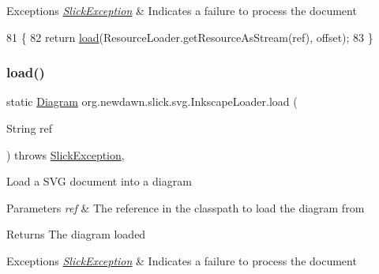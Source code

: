 \begin{DoxyExceptions}{Exceptions}
{\em \mbox{\hyperlink{classorg_1_1newdawn_1_1slick_1_1_slick_exception}{Slick\+Exception}}} & Indicates a failure to process the document \\
\hline
\end{DoxyExceptions}

\begin{DoxyCode}
81                                   \{
82         \textcolor{keywordflow}{return} \mbox{\hyperlink{classorg_1_1newdawn_1_1slick_1_1svg_1_1_inkscape_loader_a740ecc54efa6c6f4794f966ee42585cf}{load}}(ResourceLoader.getResourceAsStream(ref), offset);
83     \}
\end{DoxyCode}
\mbox{\label{classorg_1_1newdawn_1_1slick_1_1svg_1_1_inkscape_loader_a6033a0097a34ad7c33fe245416606b81}} 
\subsubsection{\texorpdfstring{load()}{load()}\hspace{0.1cm}{\footnotesize\ttfamily [2/3]}}
{\footnotesize\ttfamily static \mbox{\hyperlink{classorg_1_1newdawn_1_1slick_1_1svg_1_1_diagram}{Diagram}} org.\+newdawn.\+slick.\+svg.\+Inkscape\+Loader.\+load (\begin{DoxyParamCaption}\item[{String}]{ref }\end{DoxyParamCaption}) throws \mbox{\hyperlink{classorg_1_1newdawn_1_1slick_1_1_slick_exception}{Slick\+Exception}}\hspace{0.3cm}{\ttfamily [inline]}, {\ttfamily [static]}}

Load a S\+VG document into a diagram


\begin{DoxyParams}{Parameters}
{\em ref} & The reference in the classpath to load the diagram from \\
\hline
\end{DoxyParams}
\begin{DoxyReturn}{Returns}
The diagram loaded 
\end{DoxyReturn}

\begin{DoxyExceptions}{Exceptions}
{\em \mbox{\hyperlink{classorg_1_1newdawn_1_1slick_1_1_slick_exception}{Slick\+Exception}}} & Indicates a failure to process the document \\
\hline
\end{DoxyExceptions}


